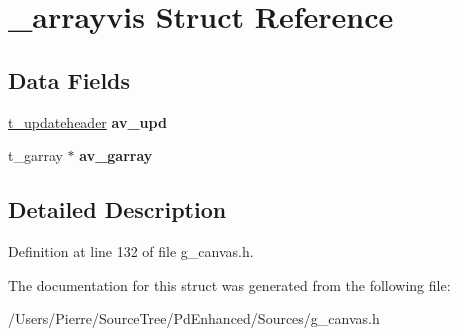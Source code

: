 \hypertarget{struct__arrayvis}{\section{\-\_\-arrayvis Struct Reference}
\label{struct__arrayvis}
}
\subsection*{Data Fields}
\begin{DoxyCompactItemize}
\item 
\hypertarget{struct__arrayvis_adc2f4406d584b63030b38f9af3e7b787}{\hyperlink{struct__updateheader}{t\-\_\-updateheader} {\bfseries av\-\_\-upd}}\label{struct__arrayvis_adc2f4406d584b63030b38f9af3e7b787}

\item 
\hypertarget{struct__arrayvis_a08515bbd50155dc864929bbf6a144738}{t\-\_\-garray $\ast$ {\bfseries av\-\_\-garray}}\label{struct__arrayvis_a08515bbd50155dc864929bbf6a144738}

\end{DoxyCompactItemize}


\subsection{Detailed Description}


Definition at line 132 of file g\-\_\-canvas.\-h.



The documentation for this struct was generated from the following file\-:\begin{DoxyCompactItemize}
\item 
/\-Users/\-Pierre/\-Source\-Tree/\-Pd\-Enhanced/\-Sources/g\-\_\-canvas.\-h\end{DoxyCompactItemize}
